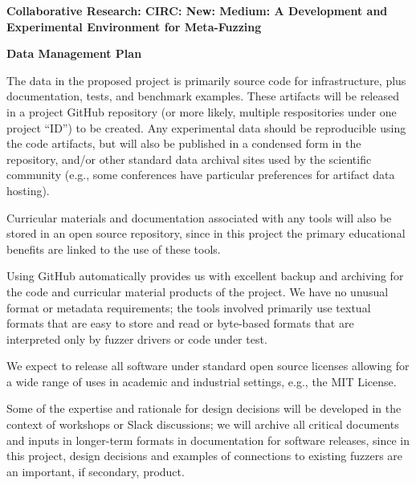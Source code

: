 \documentclass[12pt]{article}
\begin{document}
\begin{center}
{\Large\sf\textbf{Collaborative Research: CIRC: New: Medium: A Development and 
    Experimental Environment for Meta-Fuzzing
  }}
\end{center}

\begin{center}
{\sf\textbf{Data Management Plan
  }}
\end{center}
The data in the proposed project is primarily source code for
infrastructure, plus documentation, tests, and benchmark
examples. These artifacts  will be
released in a project GitHub repository (or more likely, multiple
respositories under one project ``ID'') to be created. Any experimental data should be reproducible using the code artifacts, but will also be published in a
condensed form in the repository, and/or other standard data archival
sites used by the scientific community (e.g., some conferences have
particular preferences for artifact data hosting).

Curricular materials and documentation associated with any tools will also be stored in
an open source repository, since in this project the primary educational benefits are linked
to the use of these tools.

Using GitHub automatically provides us with excellent backup and
archiving for the code and curricular material products of the project.
We have no unusual format or metadata requirements; the tools involved primarily use
textual formats that are easy to store and read or byte-based formats that are interpreted
only by fuzzer drivers or code under test.

We expect to release all software under standard open source licenses
allowing for a wide range of uses in academic and industrial settings,
e.g., the MIT License.

Some of the expertise and rationale for design decisions will be
developed in the context of workshops or Slack discussions; we will
archive all critical documents and inputs in longer-term formats in
documentation for software releases, since in this project, design
decisions and examples of connections to existing fuzzers are an
important, if secondary, product.
\end{document}
